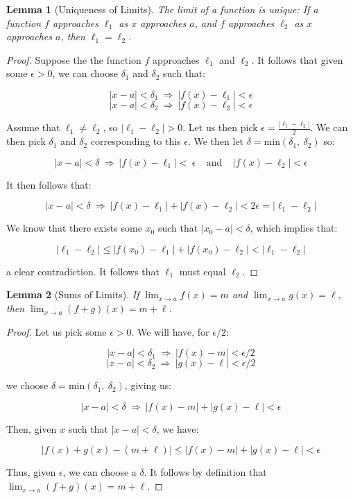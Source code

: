 \documentclass[10pt, oneside]{amsart}
\newtheorem{lem}{Lemma}
\begin{document}
    \begin{lem}[Uniqueness of Limits]
      The limit of a function is unique: If a function $f$ approaches $\ell_1$ as $x$ approaches $a$, and $f$ approaches $\ell_2$ as
      $x$ approaches $a$, then $\ell_1 = \ell_2$.
    \end{lem}

    \begin{proof}
      Suppose the the function $f$ approaches $\ell_1$ and $\ell_2$. It follows that given some $\epsilon > 0$, we can choose $\delta_1$ and $\delta_2$ such that:

      $$|x - a| < \delta_1 \ \Rightarrow \ |f(x) - \ell_1| < \epsilon$$
      $$|x - a| < \delta_2 \ \Rightarrow \ |f(x) - \ell_2| < \epsilon$$

      Assume that $\ell_1 \neq \ell_2$, so $|\ell_1 - \ell_2| > 0$. Let us then pick $\epsilon = \frac{|\ell_1 - \ell_2|}{2}$. We can then pick $\delta_1$ and $\delta_2$ corresponding
      to this $\epsilon$. We then let $\delta = \text{min}(\delta_1, \ \delta_2)$ so:

      $$|x - a| < \delta \ \Rightarrow \ |f(x) - \ell_1| < \ \epsilon \ \ \ \ \ \text{and} \ \ \ \ \ |f(x) - \ell_2| < \epsilon$$

      It then follows that:

      $$|x - a| < \delta \ \Rightarrow \ |f(x) - \ell_1| + |f(x) - \ell_2| < 2\epsilon = |\ell_1 - \ell_2|$$

      We know that there exists some $x_0$ such that $|x_0 - a| < \delta$, which implies that:

      $$|\ell_1 - \ell_2| \leq |f(x_0) - \ell_1| + |f(x_0) - \ell_2| < |\ell_1 - \ell_2|$$

      a clear contradiction. It follows that $\ell_1$ must equal $\ell_2$.

    \end{proof}

    \begin{lem}[Sums of Limits]
      If $\lim_{x \to a} f(x) = m$ and $\lim_{x \to a} g(x) = \ell$, then $\lim_{x \to a} (f + g)(x) = m + \ell$.
    \end{lem}

    \begin{proof}

      Let us pick some $\epsilon > 0$. We will have, for $\epsilon/2$:

      $$|x - a| < \delta_1 \ \Rightarrow \ |f(x) - m| < \epsilon/2$$
      $$|x - a| < \delta_2 \ \Rightarrow \ |g(x) - \ell| < \epsilon/2$$

      we choose $\delta = \text{min}(\delta_1, \ \delta_2)$, giving us:

      $$|x - a| < \delta \ \Rightarrow \ |f(x) - m| + |g(x) - \ell| < \epsilon$$

      Then, given $x$ such that $|x - a| < \delta$, we have:

      $$|f(x) + g(x) - (m + \ell)| \leq |f(x) - m| + |g(x) - \ell| < \epsilon$$

      Thus, given $\epsilon$, we can choose a $\delta$. It follows by definition that $\lim_{x \to a} (f + g)(x) = m + \ell$.

    \end{proof}
\end{document}
